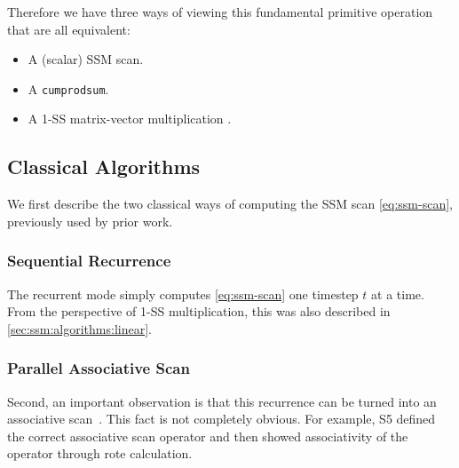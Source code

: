 Therefore we have three ways of viewing this fundamental primitive operation that are all equivalent:
\begin{itemize}
  \item A (scalar) SSM scan.
  \item A \texttt{cumprodsum}.
  \item A 1-SS matrix-vector multiplication .
\end{itemize}

\subsection{Classical Algorithms}

We first describe the two classical ways of computing the SSM scan \eqref{eq:ssm-scan},
previously used by prior work.

\subsubsection{Sequential Recurrence}
\label{sec:scan:recurrence}

The recurrent mode simply computes \eqref{eq:ssm-scan} one timestep $t$ at a time.
From the perspective of 1-SS multiplication, this was also described in \cref{sec:ssm:algorithms:linear}.

\subsubsection{Parallel Associative Scan}
\label{sec:scan:classical:parallel}

Second, an important observation is that this recurrence can be turned into an associative scan~\citep{martin2018parallelizing,smith2023s5}.
This fact is not completely obvious.
For example, S5 defined the correct associative scan operator and then showed associativity of the operator through rote calculation.

